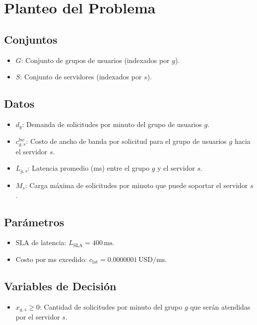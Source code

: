 \section*{Planteo del Problema}

\subsection*{Conjuntos}
\begin{itemize}
    \item $G$: Conjunto de grupos de usuarios (indexados por $g$).
    \item $S$: Conjunto de servidores (indexados por $s$).
\end{itemize}

\subsection*{Datos}
\begin{itemize}
    \item $d_g$: Demanda de solicitudes por minuto del grupo de usuarios $g$.
    \item $c_{g,s}^{bw}$: Costo de ancho de banda por solicitud para el grupo de usuarios $g$ hacia el servidor $s$.
    \item $L_{g,s}$: Latencia promedio (ms) entre el grupo $g$ y el servidor $s$.
    \item $M_s$: Carga máxima de solicitudes por minuto que puede soportar el servidor $s$.
\end{itemize}

\subsection*{Parámetros}
\begin{itemize}
    \item SLA de latencia: $L_{\text{SLA}} = 400\,\text{ms}$.
    \item Costo por ms excedido: $c_{\text{lat}} = 0.0000001\,\text{USD/ms}$.
\end{itemize}

\subsection*{Variables de Decisión}
\begin{itemize}
    \item $x_{g,s} \geq 0$: Cantidad de solicitudes por minuto del grupo $g$ que serán atendidas por el servidor $s$.
\end{itemize}

